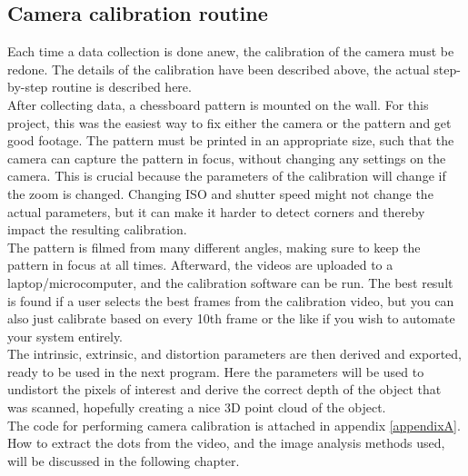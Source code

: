 \subsection{Camera calibration routine} 
Each time a data collection is done anew, the calibration of the camera must be redone. The details of the calibration have been described above, the actual step-by-step routine is described here. \\

After collecting data, a chessboard pattern is mounted on the wall. For this project, this was the easiest way to fix either the camera or the pattern and get good footage. The pattern must be printed in an appropriate size, such that the camera can capture the pattern in focus, without changing any settings on the camera. This is crucial because the parameters of the calibration will change if the zoom is changed. Changing ISO and shutter speed might not change the actual parameters, but it can make it harder to detect corners and thereby impact the resulting calibration.
\\

The pattern is filmed from many different angles, making sure to keep the pattern in focus at all times. Afterward, the videos are uploaded to a laptop/microcomputer, and the calibration software can be run. The best result is found if a user selects the best frames from the calibration video, but you can also just calibrate based on every 10th frame or the like if you wish to automate your system entirely.\\

The intrinsic, extrinsic, and distortion parameters are then derived and exported, ready to be used in the next program. Here the parameters will be used to undistort the pixels of interest and derive the correct depth of the object that was scanned, hopefully creating a nice 3D point cloud of the object.\\ 

The code for performing camera calibration is attached in appendix \ref{appendixA}. How to extract the dots from the video, and the image analysis methods used, will be discussed in the following chapter. 

